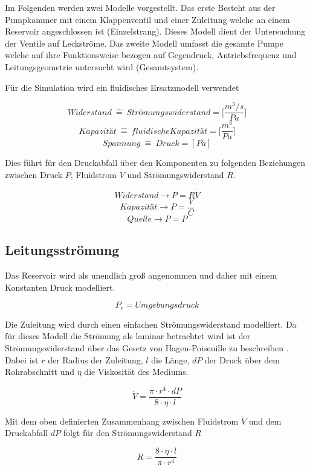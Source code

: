 \documentclass[fontsize=12pt, a4paper]{scrartcl}
\begin{document}
Im Folgenden werden zwei Modelle vorgestellt. Das erste Besteht aus der Pumpkammer mit einem Klappenventil und einer Zuleitung welche an einem Reservoir angeschlossen ist (Einzelstrang). Dieses Modell dient der Untersuchung der Ventile auf Leckströme. Das zweite Modell umfasst die gesamte Pumpe welche auf ihre Funktionsweise bezogen auf Gegendruck, Antriebsfrequenz und Leitungsgeometrie untersucht wird (Gesamtsystem).

Für die Simulation wird ein fluidisches Ersatzmodell verwendet \cite{script}

\[ Widerstand \:\widehat{=}\:  Strömungswiderstand = \biggl[\frac{m^3/s}{Pa}\biggr] \]
\[ Kapazität  \:\widehat{=}\:  fluidische Kapazität = \biggl[\frac{m^3}{Pa}\biggr] \]
\[ Spannung  \:\widehat{=}\:  Druck = [Pa] \]

Dies führt für den Druckabfall über den Komponenten zu folgenden Beziehungen zwischen Druck \(P\), Fluidstrom \(\dot{V}\) und Strömungswiderstand \(R\).

\[Widerstand \rightarrow P = R\dot{V} \]
\[Kapazität \rightarrow P = \frac{V}{C} \]
\[Quelle \rightarrow P = P \]

\subsection{Leitungsströmung}
\label{subsec:reservoirsection}
Das Reservoir wird als unendlich groß angenommen und daher mit einem Konstanten Druck modelliert.


\[ P_r = Umgebungsdruck \]

Die Zuleitung wird durch einen einfachen Strömungswiderstand modelliert. Da für dieses Modell die Strömung als laminar betrachtet wird ist der Strömungswiderstand über das Gesetz von Hagen-Poiseuille zu beschreiben \cite{fluidmechanics}. Dabei ist \( r \) der Radius der Zuleitung, \(l\) die Länge, \(dP\) der Druck über dem Rohrabschnitt und \(\eta\) die Viskosität des Mediums.

\begin{equation}
	\dot{V} = \frac{\pi \cdot r^4 \cdot dP}{8 \cdot \eta \cdot l}
	\label{eq:hagenpois}
\end{equation}

Mit dem oben definierten Zusammenhang zwischen Fluidstrom \(\dot{V}\) und dem Druckabfall \(dP\) folgt für den Strömungswiderstand \(R\)

\begin{equation}
	R = \frac{8 \cdot \eta \cdot l}{\pi \cdot r^4}
\label{eq:leckagestrom}
\end{equation}
\end{document}

